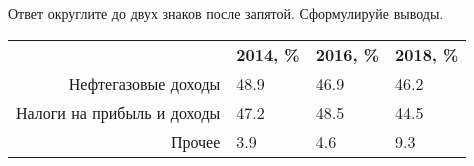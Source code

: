 \documentclass{article}
\begin{document}
Ответ округлите до двух знаков после запятой. Сформулируйе выводы.\\

\begin{minipage}{\textwidth}
\centering
\begin{tabularx}{0.8\textwidth}{rYYY}
\toprule
 & \textbf{2014, \%} & \textbf{2016, \%} & \textbf{2018, \%} \\
\cmidrule(lr){2-2}\cmidrule(lr){3-3}\cmidrule(lr){4-4}
Нефтегазовые доходы & 48.9 & 46.9 & 46.2 \\

Налоги на прибыль и доходы & 47.2 & 48.5 & 44.5 \\

Прочее & 3.9 & 4.6 & 9.3 \\
\bottomrule
\end{tabularx}
\label{task1}
\end{minipage} \\[35pt]
\end{document}
